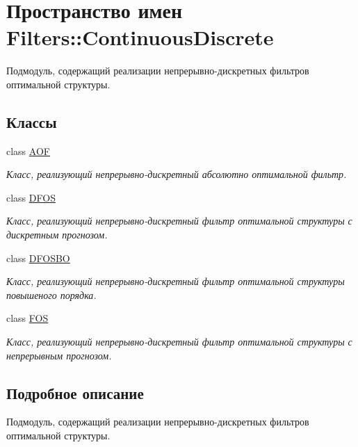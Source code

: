 \hypertarget{namespace_filters_1_1_continuous_discrete}{}\section{Пространство имен Filters\+:\+:Continuous\+Discrete}
\label{namespace_filters_1_1_continuous_discrete}


Подмодуль, содержащий реализации непрерывно-\/дискретных фильтров оптимальной структуры.  


\subsection*{Классы}
\begin{DoxyCompactItemize}
\item 
class \hyperlink{class_filters_1_1_continuous_discrete_1_1_a_o_f}{A\+OF}
\begin{DoxyCompactList}\small\item\em Класс, реализующий непрерывно-\/дискретный абсолютно оптимальной фильтр. \end{DoxyCompactList}\item 
class \hyperlink{class_filters_1_1_continuous_discrete_1_1_d_f_o_s}{D\+F\+OS}
\begin{DoxyCompactList}\small\item\em Класс, реализующий непрерывно-\/дискретный фильтр оптимальной структуры с дискретным прогнозом. \end{DoxyCompactList}\item 
class \hyperlink{class_filters_1_1_continuous_discrete_1_1_d_f_o_s_b_o}{D\+F\+O\+S\+BO}
\begin{DoxyCompactList}\small\item\em Класс, реализующий непрерывно-\/дискретный фильтр оптимальной структуры повышеного порядка. \end{DoxyCompactList}\item 
class \hyperlink{class_filters_1_1_continuous_discrete_1_1_f_o_s}{F\+OS}
\begin{DoxyCompactList}\small\item\em Класс, реализующий непрерывно-\/дискретный фильтр оптимальной структуры с непрерывным прогнозом. \end{DoxyCompactList}\end{DoxyCompactItemize}


\subsection{Подробное описание}
Подмодуль, содержащий реализации непрерывно-\/дискретных фильтров оптимальной структуры. 